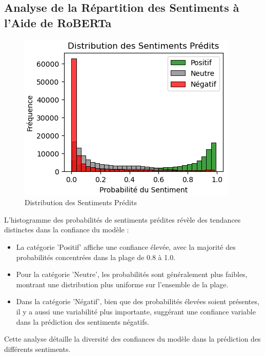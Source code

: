 

\subsection{Analyse de la Répartition des Sentiments à l'Aide de RoBERTa}
\begin{figure}[h]
    \centering
    \includegraphics[scale=0.7]{assets/distributionsentimentsRoberta.PNG}
    \caption{Distribution des Sentiments Prédits}
    \label{fig:robertaSentiments}
\end{figure}
L'histogramme des probabilités de sentiments prédites révèle des tendances distinctes dans la confiance du modèle :

\begin{itemize}
    \item La catégorie 'Positif' affiche une confiance élevée, avec la majorité des probabilités concentrées dans la plage de 0.8 à 1.0.
    
    \item Pour la catégorie 'Neutre', les probabilités sont généralement plus faibles, montrant une distribution plus uniforme sur l'ensemble de la plage.
    
    \item Dans la catégorie 'Négatif', bien que des probabilités élevées soient présentes, il y a aussi une variabilité plus importante, suggérant une confiance variable dans la prédiction des sentiments négatifs.
\end{itemize}

Cette analyse détaille la diversité des confiances du modèle dans la prédiction des différents sentiments.



